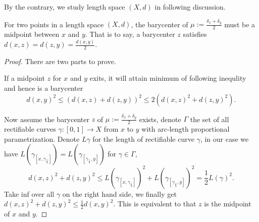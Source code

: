 By the contrary, we study length space $(X,d)$ in following discussion.

\begin{prop}
	For two points in a length space $(X,d)$, the barycenter of $\mu:=\frac{\delta_x + \delta_y}{2}$ must be a midpoint between $x$ and $y$. That is to say, a barycenter $z$ satisfies $d(x,z)=d(z,y)=\frac{d(x,y)}{2}$.
\end{prop}

\begin{proof}
	There are two parts to prove.

	If a midpoint $z$ for $x$ and $y$ exits, it will attain minimum of following inequlity and hence is a barycenter
	\[
		d(x,y)^2 \leq \left(d(x,z) + d(z,y)\right)^2 \leq 2\left(d(x,z)^2+ d(z,y)^2\right).
	\]

	Now assume the barycenter $z$ of $\mu:=\frac{\delta_x + \delta_y}{2}$ exists, denote $\Gamma$ the set of all rectifiable curves $\gamma: [0,1] \rightarrow X$ from $x$ to $y$ with arc-length proportional parametrization. Denote $L\gamma$ for the length of rectifiable curve $\gamma$, in our case we have $L(\gamma_{[x, \gamma_\frac{1}{2}]}) = L(\gamma_{[\gamma_\frac{1}{2}, y]})$ for $\gamma \in \Gamma$,
	\[
		d(x,z)^2 + d(z,y)^2 \leq {L(\gamma_{[x, \gamma_\frac{1}{2}]})}^2 + {L(\gamma_{[\gamma_\frac{1}{2}, y]})}^2=\frac{1}{2} {L(\gamma)}^2.
	\]
	Take inf over all $\gamma$ on the right hand side, we finally get $d(x,z)^2 + d(z,y)^2 \leq \frac{1}{2}d(x,y)^2$. This is equivalent to that $z$ is the midpoint of $x$ and $y$.
\end{proof}

